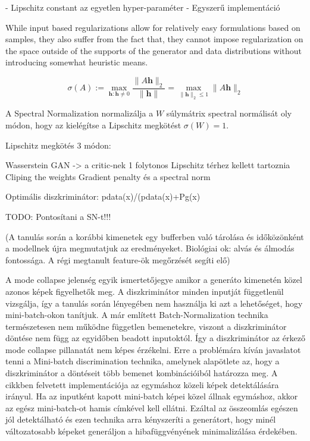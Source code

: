 - Lipschitz constant az egyetlen hyper-paraméter
- Egyszerű implementáció

While input based regularizations allow for relatively easy formulations based on samples, they also
suffer from the fact that, they cannot impose regularization on the space outside of the supports of
the generator and data distributions without introducing somewhat heuristic means.


$$ \sigma(A) := \max_{\boldsymbol{h}:\boldsymbol{h}\neq 0} \frac{\|A\boldsymbol{h}\|_2}{\|\boldsymbol{h}\|} = \max_{\|\boldsymbol{h}\|_2 \leq 1} \|A\boldsymbol{h}\|_2$$

A Spectral Normalization normalizálja a $W$ súlymátrix spectral normálisát oly módon, hogy az kielégítse a Lipschitz megkötést $\sigma(W) = 1$.



Lipschitz megkötés 3 módon:

Wasserstein GAN -> a critic-nek 1 folytonos Lipschitz térhez kellett tartoznia
Cliping the weights
Gradient penalty és a spectral norm

Optimális diszkriminátor: pdata(x)/(pdata(x)+Pg(x)

TODO: Pontosítani a SN-t!!!

(A tanulás során a korábbi kimenetek egy bufferben való tárolása és időközönként a modellnek újra megmutatjuk az eredményeket. Biológiai ok: alvás és álmodás fontossága. A régi megtanult feature-ök megőrzését segíti elő)

A mode collapse jelenség egyik ismertetőjegye amikor a generáto kimenetén közel azonos képek figyelhetők meg. A diszkriminátor minden inputját függetlenül vizsgálja, így a tanulás során lényegében nem használja ki azt a lehetőséget, hogy mini-batch-okon tanítjuk. A már említett Batch-Normalization technika természetesen nem működne független bemenetekre, viszont a diszkriminátor döntése nem függ az egyidőben beadott inputoktól. Így a diszkriminátor az érkező mode collapse pillanatát nem képes érzékelni.
Erre a problémára kíván javaslatot tenni a Mini-batch discrimination technika, amelynek alapötlete az, hogy a diszkriminátor a döntéseit több bemenet kombinációiból határozza meg.
A cikkben felvetett implementációja az egymáshoz közeli képek detektálására irányul. Ha az inputként kapott mini-batch képei közel állnak egymáshoz, akkor az egész mini-batch-ot hamis címkével kell ellátni. Ezáltal az összeomlás egészen jól detektálható és ezen technika arra kényszeríti a generátort, hogy minél változatosabb képeket generáljon a hibafüggvényének minimalizálása érdekében.

